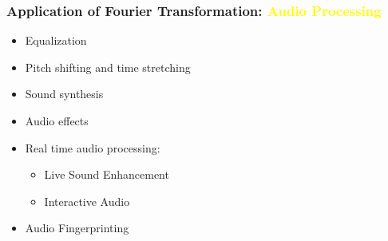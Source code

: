\documentclass[aspectratio=1610]{beamer}
\begin{document}
  \begin{frame}
    \frametitle{Application of Fourier Transformation: \textcolor{yellow}{Audio Processing}}
    \begin{itemize} [label=$\star$, itemsep=7pt, parsep=0pt, topsep=10pt]
        \item<1-> Equalization
        \item <2-> Pitch shifting and time stretching
        \item <3-> Sound synthesis
        \item <4-> Audio effects
        \item <5-> Real time audio processing:
            \begin{itemize}[label=$\bullet$, itemsep=7pt, parsep=0pt, topsep=10pt]
                \item<6-> Live Sound Enhancement
                \item<7-> Interactive Audio
            \end{itemize}
        \item <8-> Audio Fingerprinting
    \end{itemize} 
  \end{frame}
\end{document}
